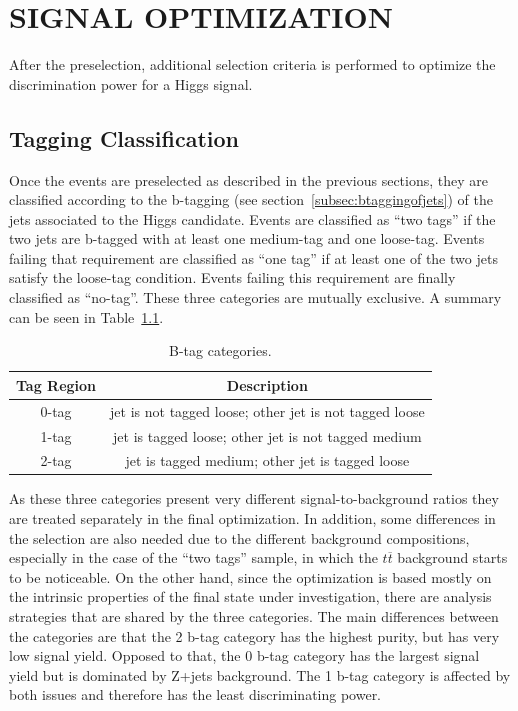

\chapter{SIGNAL OPTIMIZATION}


After the preselection, additional selection criteria is performed to optimize the discrimination power for a Higgs signal.

\section{Tagging Classification}

Once the events are preselected as described in the previous sections, they are classified according to the b-tagging (see section~\ref{subsec:btaggingofjets})  of the jets associated to the Higgs candidate. Events are classified as ``two tags'' if the two jets are b-tagged with at least one medium-tag and one loose-tag. Events failing that requirement are classified as ``one tag'' if at least one of the two jets satisfy the loose-tag condition. Events failing this requirement are finally classified as ``no-tag''.  These three categories are mutually exclusive.  A summary can be seen in Table~\ref{tab:btagcateg}.

\begin{table}[htb!]
\caption{ 
B-tag categories.
}
\label{tab:btagcateg}
\vspace*{\medskipamount}
\begin{center}
\small
\begin{tabular}{|c|c|}
\hline
Tag Region & Description\\
\hline
0-tag & jet is not tagged loose; other jet is not tagged loose \\
1-tag & jet is tagged loose; other jet is not tagged medium \\
2-tag & jet is tagged medium; other jet is tagged loose \\
\hline
\end{tabular}
\end{center}
\end{table}

As these three categories present very different signal-to-background ratios they are treated separately in the final optimization. In addition, some differences in the selection are also needed due to the different background compositions, especially in the case of the ``two tags'' sample, in which the $t\overline{t}$ background starts to be noticeable. On the other hand, since the optimization is based mostly on the intrinsic properties of the final state under investigation, there are analysis strategies that are shared by the three categories. The main differences between the categories are that the 2 b-tag category has the highest purity, but has very low signal yield.  Opposed to that, the 0 b-tag category has the largest signal yield but is dominated by Z+jets background. The 1 b-tag category is affected by both issues and therefore has the least discriminating power.

